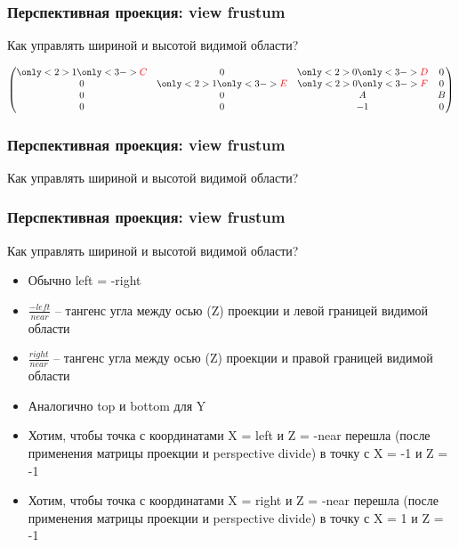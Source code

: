 \documentclass[10pt]{beamer}
\begin{document}
\begin{frame}[fragile]
\frametitle{Перспективная проекция: view frustum}
Как управлять шириной и высотой видимой области?
\pause
\begin{center}
\begin{math}
\begin{pmatrix}
\only<2>{1}\only<3->{\color{red}C} & 0 & \only<2>{0}\only<3->{\color{red}D} & 0 \\
0 & \only<2>{1}\only<3->{\color{red}E} & \only<2>{0}\only<3->{\color{red}F} & 0 \\
0 & 0 & A & B \\
0 & 0 & -1 & 0
\end{pmatrix}
\end{math}
\end{center}
\end{frame}

\begin{frame}[fragile]
\frametitle{Перспективная проекция: view frustum}
Как управлять шириной и высотой видимой области?
\end{frame}

\begin{frame}[fragile]
\frametitle{Перспективная проекция: view frustum}
Как управлять шириной и высотой видимой области?
\begin{itemize}
\item Обычно left = -right
\pause
\item \begin{math}\frac{-left}{near}\end{math} -- тангенс угла между осью (Z) проекции и левой границей видимой области
\item \begin{math}\frac{right}{near}\end{math} -- тангенс угла между осью (Z) проекции и правой границей видимой области
\pause
\item Аналогично top и bottom для Y
\pause
\item Хотим, чтобы точка с координатами X = left и Z = -near перешла (после применения матрицы проекции и perspective divide) в точку с X = -1 и Z = -1
\item Хотим, чтобы точка с координатами X = right и Z = -near перешла (после применения матрицы проекции и perspective divide) в точку с X = 1 и Z = -1
\end{itemize}
\end{frame}
\end{document}

